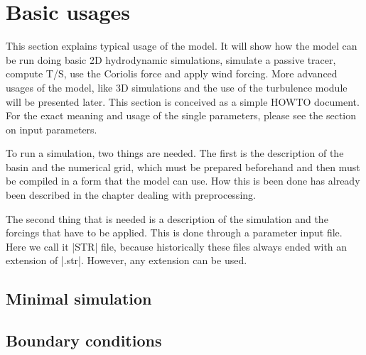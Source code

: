 \documentclass{report}
\newcommand{\todo}[1]{This section still has to be written by #1}
\begin{document}
\section{Basic usages}

This section explains typical usage of the model. It will show how
the model can be run doing basic 2D hydrodynamic simulations, simulate
a passive tracer, compute T/S, use the Coriolis force and apply wind
forcing. More advanced usages of the model, like 3D simulations and the
use of the turbulence module will be presented later. This section is
conceived as a simple HOWTO document. For the exact meaning and usage
of the single parameters, please see the section on input parameters.

To run a simulation, two things are needed. The first is the description
of the basin and the numerical grid, which must be prepared beforehand and
then must be compiled in a form that the model can use. How this is been
done has already been described in the chapter dealing with preprocessing.

The second thing that is needed is a description of the simulation and the
forcings that have to be applied. This is done through a parameter input
file. Here we call it |STR| file, because historically these files always
ended with an extension of |.str|. However, any extension can be used.

	\subsection{Minimal simulation}
	

	\subsection{Boundary conditions}
	



\end{document}
